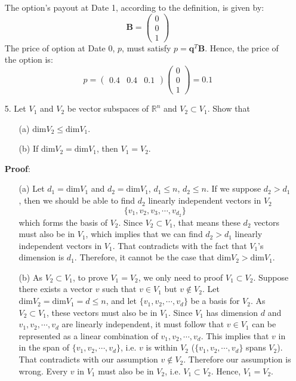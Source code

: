 \documentclass{article}
\begin{document}
\begin{enumerate}
    The option's payout at Date 1, according to the definition, is given by: 
    $$ \mathbf{B} = \begin{pmatrix}0\\0\\1\end{pmatrix}$$ 
    The price of option at Date 0, $p$, must satisfy $p=\mathbf{q}^T \mathbf{B}$. Hence, the price of the option is:
    $$ p = \begin{pmatrix}0.4 &0.4 &0.1\end{pmatrix} \begin{pmatrix}0\\0\\1\end{pmatrix} = 0.1 $$
    
    
    \item[5. ] Let $V_1$ and $V_2$ be vector subspaces of $\mathbb{R}^n$ and $V_2 \subset V_1$. Show that
        \begin{enumerate}
            \item[(a)] $ \textrm{dim} V_2 \leq \textrm{dim} V_1 $.
            \item[(b)] If $ \textrm{dim} V_2 = \textrm{dim} V_1 $, then $ V_1 = V_2 $.
        \end{enumerate}
     
     \textbf{Proof}: 
        \begin{enumerate}
            \item[(a)] Let $d_1=\textrm{dim} V_1$ and $d_2=\textrm{dim} V_1$, $d_1 \leq n$, $d_2 \leq n$. If we suppose $d_2 > d_1$, then we should be able to find $d_2$ linearly independent vectors in $V_2$ $$\{ v_1, v_2, v_3, \cdots, v_{d_2}\}$$ which forms the basis of $V_2$. Since $V_2 \subset V_1$, that means these $d_2$ vectors must also be in $V_1$, which implies that we can find $d_2 > d_1$ linearly independent vectors in $V_1$. That contradicts with the fact that $V_1$'s dimension is $d_1$. Therefore, it cannot be the case that $ \textrm{dim} V_2 > \textrm{dim} V_1 $.
            
            \item[(b)] As $V_2 \subset V_1$, to prove $V_1=V_2$, we only need to proof $V_1 \subset V_2$. Suppose there exists a vector $v$ such that $v \in V_1$ but $v \not\in V_2$. Let $ \textrm{dim} V_2 = \textrm{dim} V_1 = d \leq n $, and let $\{ v_1, v_2, \cdots, v_d\}$ be a basis for $V_2$. As $V_2 \subset V_1$, these vectors must also be in $V_1$. Since $V_1$ has dimension $d$ and $v_1, v_2, \cdots, v_d$ are linearly independent, it must follow that $v \in V_1$ can be represented as a linear combination of $v_1, v_2, \cdots, v_d$. This implies that $v$ in in the span of $\{ v_1, v_2, \cdots, v_d\}$, i.e. $v$ is within $V_2$ ($\{ v_1, v_2, \cdots, v_d\}$ spans $V_2$). That contradicts with our assumption $v \not\in V_2$. Therefore our assumption is wrong. Every $v$ in $V_1$ must also be in $V_2$, i.e. $V_1 \subset V_2$. Hence, $ V_1 = V_2 $.
            
        \end{enumerate}
\end{enumerate}
\end{document}
